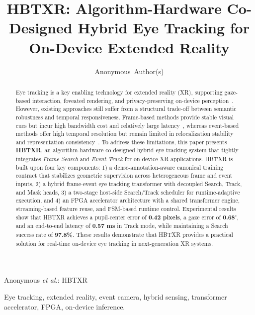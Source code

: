 ﻿\documentclass[journal]{IEEEtran}
\begin{document}
\title{HBTXR: Algorithm-Hardware Co-Designed Hybrid Eye Tracking for On-Device Extended Reality}

\author{Anonymous~Author(s)}

%
{Anonymous \MakeLowercase{\textit{et al.}}: HBTXR}

\maketitle

\begin{abstract}
Eye tracking is a key enabling technology for extended reality (XR), supporting gaze-based interaction, foveated rendering, and privacy-preserving on-device perception~\cite{plopski2022eye,kwon2023xrbench}. However, existing approaches still suffer from a structural trade-off between semantic robustness and temporal responsiveness. Frame-based methods provide stable visual cues but incur high bandwidth cost and relatively large latency~\cite{li2018etracker,chen2022real}, whereas event-based methods offer high temporal resolution but remain limited in relocalization stability and representation consistency~\cite{li2024gaze,li2023track,ding2025facet}. To address these limitations, this paper presents \textbf{HBTXR}, an algorithm-hardware co-designed hybrid eye tracking system that tightly integrates \emph{Frame Search} and \emph{Event Track} for on-device XR applications. HBTXR is built upon four key components: 1) a dense-annotation-aware canonical training contract that stabilizes geometric supervision across heterogeneous frame and event inputs, 2) a hybrid frame-event eye tracking transformer with decoupled Search, Track, and Mask heads, 3) a two-stage host-side Search/Track scheduler for runtime-adaptive execution, and 4) an FPGA accelerator architecture with a shared transformer engine, streaming-based feature reuse, and FSM-based runtime control. Experimental results show that HBTXR achieves a pupil-center error of \textbf{0.42 pixels}, a gaze error of \textbf{0.68$^\circ$}, and an end-to-end latency of \textbf{0.57 ms} in Track mode, while maintaining a Search success rate of \textbf{97.8\%}. These results demonstrate that HBTXR provides a practical solution for real-time on-device eye tracking in next-generation XR systems.
\end{abstract}

\begin{IEEEkeywords}
Eye tracking, extended reality, event camera, hybrid sensing, transformer accelerator, FPGA, on-device inference.
\end{IEEEkeywords}
\end{document}
